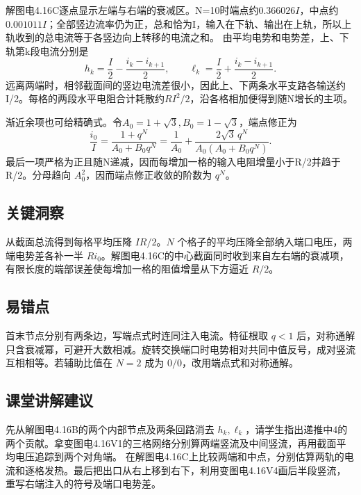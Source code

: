 \documentclass[UTF8,fontset=fandol,a4paper,11pt]{ctexart}
\begin{document}
解图电4.16C逐点显示左端与右端的衰减区。N=10时端点约$0.366026I$，中点约$0.001011I$；全部竖边流率仍为正，总和恰为I，输入在下轨、输出在上轨，所以上轨收到的总电流等于各竖边向上转移的电流之和。
由平均电势和电势差，上、下轨第k段电流分别是
\[
h_k=\frac I2-\frac{i_k-i_{k+1}}2,\qquad
\ell_k=\frac I2+\frac{i_k-i_{k+1}}2.
\]
远离两端时，相邻截面间的竖边电流差很小，因此上、下两条水平支路各输送约I/2。每格的两段水平电阻合计耗散约$RI^2/2$，沿各格相加便得到随N增长的主项。

渐近余项也可给精确式。令$A_0=1+\sqrt3,B_0=1-\sqrt3$，端点修正为
\[
\frac{i_0}{I}=\frac{1+q^N}{A_0+B_0q^N}
=\frac1{A_0}+\frac{2\sqrt3\,q^N}{A_0(A_0+B_0q^N)}.
\]
最后一项严格为正且随N递减，因而每增加一格的输入电阻增量小于R/2并趋于R/2。分母趋向 $A_0^2$，因而端点修正收敛的阶数为 $q^N$。




\subsection*{关键洞察}

从截面总流得到每格平均压降 $IR/2$。$N$ 个格子的平均压降全部纳入端口电压，两端电势差各补一半 $Ri_0$。解图电4.16C的中心截面同时收到来自左右端的衰减项，有限长度的端部误差使每增加一格的阻值增量从下方逼近 $R/2$。



\subsection*{易错点}

首末节点分别有两条边，写端点式时连同注入电流。特征根取 $q<1$ 后，对称通解只含衰减幂，可避开大数相减。旋转交换端口时电势相对共同中值反号，成对竖流互相相等。若辅助比值在 $N=2$ 成为 $0/0$，改用端点式和对称通解。



\subsection*{课堂讲解建议}

先从解图电4.16B的两个内部节点及两条回路消去 $h_k,\ell_k$，请学生指出递推中4的两个贡献。拿变图电4.16V1的三格网络分别算两端竖流及中间竖流，再用截面平均电压追踪到两个对角端。
在解图电4.16C上比较两端和中点，分别估算两轨的电流和逐格发热。最后把出口从右上移到右下，利用变图电4.16V4画后半段竖流，重写右端注入的符号及端口电势差。
\end{document}
